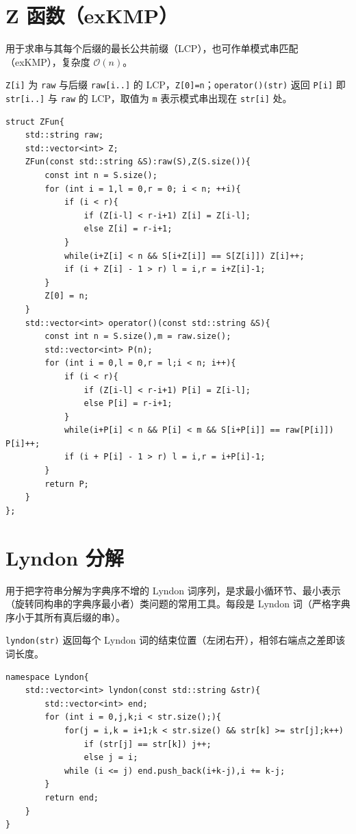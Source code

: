 \section{Z 函数（exKMP）}

用于求串与其每个后缀的最长公共前缀（LCP），也可作单模式串匹配（exKMP），复杂度 $\mathcal{O}(n)$。

\texttt{Z[i]} 为 \texttt{raw} 与后缀 \texttt{raw[i..]} 的 LCP，\texttt{Z[0]=n}；\texttt{operator()(str)} 返回 \texttt{P[i]} 即 \texttt{str[i..]} 与 \texttt{raw} 的 LCP，取值为 \texttt{m} 表示模式串出现在 \texttt{str[i]} 处。

\begin{lstlisting}
struct ZFun{
    std::string raw;
    std::vector<int> Z;
    ZFun(const std::string &S):raw(S),Z(S.size()){
        const int n = S.size();
        for (int i = 1,l = 0,r = 0; i < n; ++i){
            if (i < r){
                if (Z[i-l] < r-i+1) Z[i] = Z[i-l];
                else Z[i] = r-i+1;
            }
            while(i+Z[i] < n && S[i+Z[i]] == S[Z[i]]) Z[i]++;
            if (i + Z[i] - 1 > r) l = i,r = i+Z[i]-1;
        }
        Z[0] = n;
    }
    std::vector<int> operator()(const std::string &S){
        const int n = S.size(),m = raw.size();
        std::vector<int> P(n);
        for (int i = 0,l = 0,r = l;i < n; i++){
            if (i < r){
                if (Z[i-l] < r-i+1) P[i] = Z[i-l];
                else P[i] = r-i+1;
            }
            while(i+P[i] < n && P[i] < m && S[i+P[i]] == raw[P[i]]) P[i]++;
            if (i + P[i] - 1 > r) l = i,r = i+P[i]-1;
        }
        return P;
    }
};
\end{lstlisting}

\section{Lyndon 分解}

用于把字符串分解为字典序不增的 Lyndon 词序列，是求最小循环节、最小表示（旋转同构串的字典序最小者）类问题的常用工具。每段是 Lyndon 词（严格字典序小于其所有真后缀的串）。

\texttt{lyndon(str)} 返回每个 Lyndon 词的结束位置（左闭右开），相邻右端点之差即该词长度。

\begin{lstlisting}
namespace Lyndon{
    std::vector<int> lyndon(const std::string &str){
        std::vector<int> end;
        for (int i = 0,j,k;i < str.size();){
            for(j = i,k = i+1;k < str.size() && str[k] >= str[j];k++)
                if (str[j] == str[k]) j++;
                else j = i;
            while (i <= j) end.push_back(i+k-j),i += k-j;
        }
        return end;
    }
}
\end{lstlisting}

